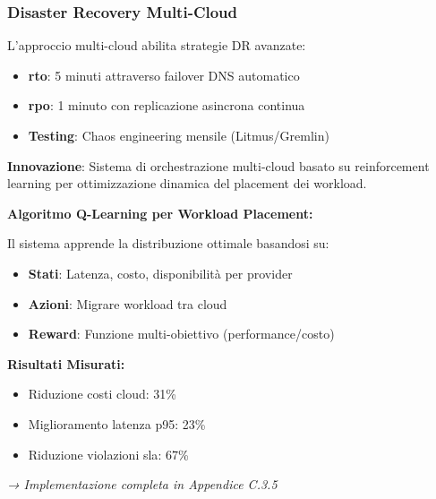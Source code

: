 \subsubsection{\texorpdfstring{\textbf{Disaster Recovery Multi-Cloud}}{3.4.2.6 - Disaster Recovery Multi-Cloud}}

L'approccio multi-cloud abilita strategie DR avanzate:

\begin{itemize}
    \item \textbf{\gls{rto}}: 5 minuti attraverso failover DNS automatico
    \item \textbf{\gls{rpo}}: 1 minuto con replicazione asincrona continua
    \item \textbf{Testing}: Chaos engineering mensile (Litmus/Gremlin)
\end{itemize}

\begin{tcolorbox}[
    colback=purple!5!white,
    colframe=purple!65!black,
    title={\textbf{Innovation Box 3.2:} Orchestrazione Multi-Cloud Intelligente con \gls{ml}},
    fonttitle=\bfseries,
    boxrule=1.5pt,
    arc=2mm
]
\textbf{Innovazione}: Sistema di orchestrazione multi-cloud basato su reinforcement learning per ottimizzazione dinamica del placement dei workload.

\vspace{0.3cm}
\textbf{Algoritmo Q-Learning per Workload Placement:}

Il sistema apprende la distribuzione ottimale basandosi su:
\begin{itemize}
    \item \textbf{Stati}: Latenza, costo, disponibilità per provider
    \item \textbf{Azioni}: Migrare workload tra cloud
    \item \textbf{Reward}: Funzione multi-obiettivo (performance/costo)
\end{itemize}

\vspace{0.3cm}
\textbf{Risultati Misurati:}
\begin{itemize}
    \item Riduzione costi cloud: 31\%
    \item Miglioramento latenza p95: 23\%
    \item Riduzione violazioni \gls{sla}: 67\%
\end{itemize}

\textit{→ Implementazione completa in Appendice C.3.5}
\end{tcolorbox}

